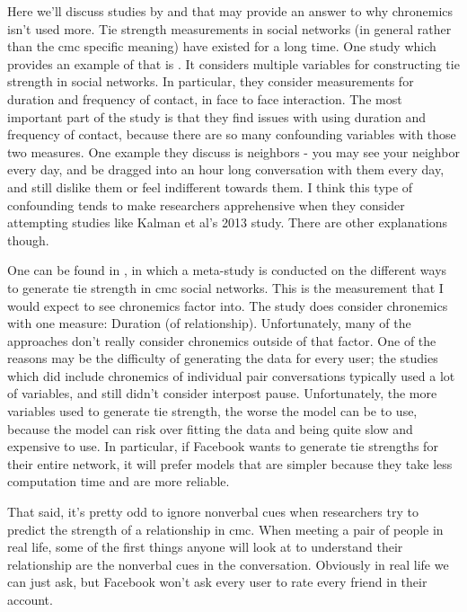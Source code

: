 \documentclass[
  stu]{apa7}
\begin{document}
Here we'll discuss studies by \textcite{marsden84} and
\textcite{liberatore17} that may provide an answer to why chronemics
isn't used more. Tie strength measurements in social networks (in
general rather than the cmc specific meaning) have existed for a long
time. One study which provides an example of that is
\textcite{marsden84}. It considers multiple variables for constructing
tie strength in social networks. In particular, they consider
measurements for duration and frequency of contact, in face to face
interaction. The most important part of the study is that they find
issues with using duration and frequency of contact, because there are
so many confounding variables with those two measures. One example they
discuss is neighbors - you may see your neighbor every day, and be
dragged into an hour long conversation with them every day, and still
dislike them or feel indifferent towards them. I think this type of
confounding tends to make researchers apprehensive when they consider
attempting studies like Kalman et al's 2013 study. There are other
explanations though.

One can be found in \textcite{liberatore17}, in which a meta-study is
conducted on the different ways to generate tie strength in cmc social
networks. This is the measurement that I would expect to see chronemics
factor into. The study does consider chronemics with one measure:
Duration (of relationship). Unfortunately, many of the approaches don't
really consider chronemics outside of that factor. One of the reasons
may be the difficulty of generating the data for every user; the studies
which did include chronemics of individual pair conversations typically
used a lot of variables, and still didn't consider interpost pause.
Unfortunately, the more variables used to generate tie strength, the
worse the model can be to use, because the model can risk over fitting
the data and being quite slow and expensive to use. In particular, if
Facebook wants to generate tie strengths for their entire network, it
will prefer models that are simpler because they take less computation
time and are more reliable.

That said, it's pretty odd to ignore nonverbal cues when researchers try
to predict the strength of a relationship in cmc. When meeting a pair of
people in real life, some of the first things anyone will look at to
understand their relationship are the nonverbal cues in the
conversation. Obviously in real life we can just ask, but Facebook won't
ask every user to rate every friend in their account.
\end{document}
